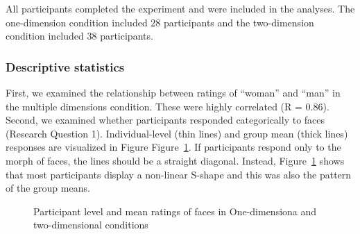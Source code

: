 \documentclass[
  man,
  longtable,
  nolmodern,
  notxfonts,
  notimes,
  colorlinks=true,linkcolor=blue,citecolor=blue,urlcolor=blue]{apa7}
\begin{document}
All participants completed the experiment and were included in the
analyses. The one-dimension condition included 28 participants and the
two-dimension condition included 38 participants.

\subsubsection{Descriptive statistics}\label{descriptive-statistics}

First, we examined the relationship between ratings of ``woman'' and
``man'' in the multiple dimensions condition. These were highly
correlated (R = 0.86). Second, we examined whether participants
responded categorically to faces (Research Question 1). Individual-level
(thin lines) and group mean (thick lines) responses are visualized in
Figure Figure~\ref{fig-desc-two}. If participants respond only to the
morph of faces, the lines should be a straight diagonal. Instead,
Figure~\ref{fig-desc-two} shows that most participants display a
non-linear S-shape and this was also the pattern of the group means.

\begin{figure}

\caption{\label{fig-desc-two}Participant level and mean ratings of faces
in One-dimensiona and two-dimensional conditions}


\end{figure}%
\end{document}
